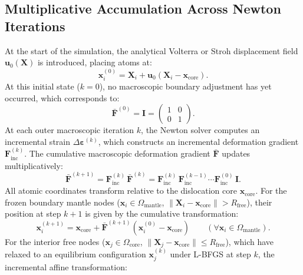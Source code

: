 \documentclass[11pt,a4paper]{article}
\begin{document}
\subsection{Multiplicative Accumulation Across Newton Iterations}

At the start of the simulation, the analytical Volterra or Stroh displacement field $\mathbf{u}_0(\mathbf{X})$ is introduced, placing atoms at:
\begin{equation}
\mathbf{x}_i^{(0)} = \mathbf{X}_i + \mathbf{u}_0(\mathbf{X}_i - \mathbf{x}_{\text{core}}).
\end{equation}
At this initial state ($k = 0$), no macroscopic boundary adjustment has yet occurred, which corresponds to:
\begin{equation}
\bar{\mathbf{F}}^{(0)} = \mathbf{I} = \begin{pmatrix} 1 & 0 \\ 0 & 1 \end{pmatrix}.
\end{equation}
At each outer macroscopic iteration $k$, the Newton solver computes an incremental strain $\Delta\boldsymbol{\varepsilon}^{(k)}$, which constructs an incremental deformation gradient $\mathbf{F}_{\text{inc}}^{(k)}$. The cumulative macroscopic deformation gradient $\bar{\mathbf{F}}$ updates multiplicatively:
\begin{equation}
\label{eq:F_bar_update}
\bar{\mathbf{F}}^{(k+1)} = \mathbf{F}_{\text{inc}}^{(k)} \, \bar{\mathbf{F}}^{(k)} = \mathbf{F}_{\text{inc}}^{(k)} \, \mathbf{F}_{\text{inc}}^{(k-1)} \cdots \mathbf{F}_{\text{inc}}^{(0)} \, \mathbf{I}.
\end{equation}
All atomic coordinates transform relative to the dislocation core $\mathbf{x}_{\text{core}}$. For the frozen boundary mantle nodes ($\mathbf{x}_i \in \Omega_{\text{mantle}}$, $\|\mathbf{X}_i - \mathbf{x}_{\text{core}}\| > R_{\text{free}}$), their position at step $k+1$ is given by the cumulative transformation:
\begin{equation}
\label{eq:coord_cumul}
\mathbf{x}_i^{(k+1)} = \mathbf{x}_{\text{core}} + \bar{\mathbf{F}}^{(k+1)} \left( \mathbf{x}_i^{(0)} - \mathbf{x}_{\text{core}} \right) \qquad (\forall \mathbf{x}_i \in \Omega_{\text{mantle}}).
\end{equation}
For the interior free nodes ($\mathbf{x}_j \in \Omega_{\text{core}}$, $\|\mathbf{X}_j - \mathbf{x}_{\text{core}}\| \le R_{\text{free}}$), which have relaxed to an equilibrium configuration $\mathbf{x}_j^{(k)}$ under L-BFGS at step $k$, the incremental affine transformation:
\end{document}
